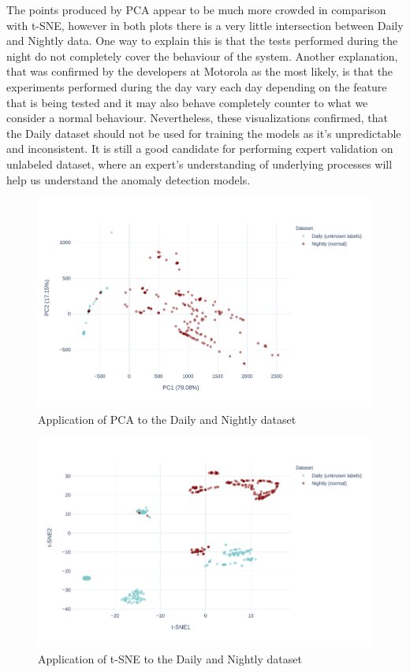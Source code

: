 The points produced by PCA appear to be much more crowded in comparison with t-SNE, however in both plots there is a very little intersection between Daily and Nightly data. One way to explain this is that the tests performed during the night do not completely cover the behaviour of the system. Another explanation, that was confirmed by the developers at Motorola as the most likely, is that the experiments performed during the day vary each day depending on the feature that is being tested and it may also behave completely counter to what we consider a normal behaviour. Nevertheless, these visualizations confirmed, that the Daily dataset should not be used for training the models as it's unpredictable and inconsistent. It is still a good candidate for performing expert validation on unlabeled dataset, where an expert's understanding of underlying processes will help us understand the anomaly detection models.

\begin{figure}[h]
    \centering
    \includegraphics[width=\textwidth]{img/pca-nightly-daily.pdf}
    \caption{Application of PCA to the Daily and Nightly dataset}
    \label{fig:pca-nightly-daily}
\end{figure}

\begin{figure}[h]
    \centering
    \includegraphics[width=\textwidth]{img/tsne-nightly-daily.pdf}
    \caption{Application of t-SNE to the Daily and Nightly dataset}
    \label{fig:tsne-nightly-daily}
\end{figure}

